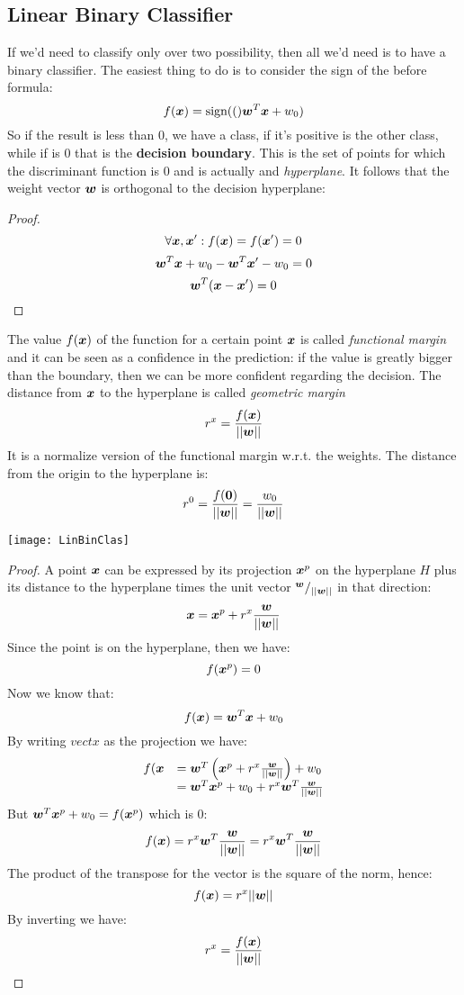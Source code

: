 \subsection{Linear Binary Classifier}
If we'd need to classify only over two possibility, then all we'd need is to have a binary classifier. The easiest thing to do is to consider the sign of the before formula:
\[f(\bm{x})=\text{sign}(()\bm{w}^T\bm{x}+w_0)\]
So if the result is less than 0, we have a class, if it's positive is the other class, while if is 0 that is the \textbf{decision boundary}. This is the set of points for which the discriminant function is 0 and is actually and \textit{hyperplane}. \newline
It follows that the weight vector $\bm{w}$ is orthogonal to the decision hyperplane:
\begin{proof}
\[\forall \bm{x},\bm{x}':f(\bm{x})=f(\bm{x}')=0\]
\[\bm{w}^T\bm{x}+w_0-\bm{w}^T\bm{x}'-w_0=0\]
\[\bm{w}^T(\bm{x}-\bm{x}')=0\]
\end{proof}
The value $f(\bm{x})$ of the function for a certain point $\bm{x}$ is called \textit{functional margin} and it can be seen as a confidence in the prediction: if the value is greatly bigger than the boundary, then we can be more confident regarding the decision. \newline
The distance from $\bm{x}$ to the hyperplane is called \textit{geometric margin}
\[r^x=\frac{f(\bm{x})}{\vert\vert\bm{w}\vert\vert}\]
It is a normalize version of the functional margin w.r.t. the weights. \newline
The distance from the origin to the hyperplane is:
\[r^0=\frac{f(\bm{0})}{\vert\vert\bm{w}\vert\vert}=\frac{w_0}{\vert\vert\bm{w}\vert\vert}\]
\begin{center}
  \texttt{[image: LinBinClas]}
\end{center}
\begin{proof}
A point $\bm{x}$ can be expressed by its projection $\bm{x}^p$ on the hyperplane $H$ plus its distance to the hyperplane times the unit vector ${}^{\bm{w}}/_{\vert\vert\bm{w}\vert\vert}$ in that direction:
\[\bm{x}=\bm{x}^p+r^x\frac{\bm{w}}{\vert\vert\bm{w}\vert\vert}\]
Since the point is on the hyperplane, then we have:
\[f(\bm{x}^p)=0\]
Now we know that:
\[f(\bm{x})=\bm{w}^T\bm{x}+w_0\]
By writing $vect{x}$ as the projection we have:
\[
  \begin{array}{ll}
    f(\bm{x}&=\bm{w}^T\left(\bm{x}^p+r^x\frac{\bm{w}}{\vert\vert\bm{w}\vert\vert}\right)+w_0\\
              &=\bm{w}^T\bm{x}^p+w_0+r^x\bm{w}^T\frac{\bm{w}}{\vert\vert{\bm{w}\vert\vert}}
  \end{array}
\]
But $\bm{w}^T\bm{x}^p+w_0=f(\bm{x}^p)$ which is 0:
\[f(\bm{x})=r^x\bm{w}^T\frac{\bm{w}}{\vert\vert\bm{w}\vert\vert}=r^x\bm{w}^T\frac{\bm{w}}{\vert\vert\bm{w}\vert\vert}\]
The product of the transpose for the vector is the square of the norm, hence:
\[f(\bm{x})=r^x\vert\vert\bm{w}\vert\vert\]
By inverting we have:
\[r^x=\frac{f(\bm{x})}{\vert\vert\bm{w}\vert\vert}\]
\end{proof}



